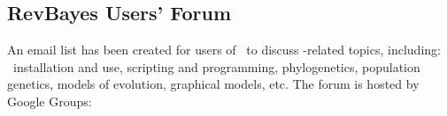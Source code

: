 \bigskip
\subsection{RevBayes Users' Forum}

An email list has been created for users of \RevBayes~to discuss \RevBayes-related topics, including: \RevBayes~installation and use, scripting and programming, phylogenetics, population genetics, models of evolution, graphical models, etc. The forum is hosted by Google Groups:






